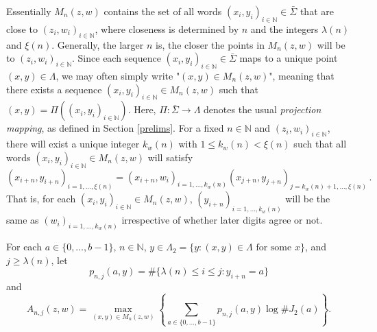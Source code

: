 \documentclass[12pt]{article}
\theoremstyle{remark}
\numberwithin{equation}{section}
\renewcommand{\Bbb}[1]{\mathbb{#1}}
\newcommand{\N}{{\Bbb N}}         %
\newcommand{\0}{\mathbf{0}}
\begin{document}
Essentially $M_{n}(z,w)$ contains the set of all words $(x_{i},y_{i})_{i \in \N} \in \bar{\Sigma}$ that are close to $(z_{i},w_{i})_{i \in \N}$, where closeness is determined by $n$ and the integers $\lambda(n)$ and $\xi(n)$. Generally, the larger $n$ is, the closer the points in $M_n(z,w)$ will be to $(z_i,w_i)_{i \in \N}$. Since each sequence $(x_{i},y_{i})_{i \in \N} \in \bar{\Sigma}$ maps to a unique point $(x,y) \in \Lambda$, we may often simply write "$(x,y) \in M_{n}(z,w)$", meaning that there exists a sequence $(x_{i},y_{i})_{i \in \N} \in M_{n}(z,w)$ such that $(x,y)=\Pi((x_{i},y_{i})_{i \in \N})$. Here, $\Pi: \bar{\Sigma} \to \Lambda$ denotes the usual \emph{projection mapping}, as defined in Section \ref{prelims}. For a fixed $n \in \N$ and $(z_{i},w_{i})_{i \in \N}$, there will exist a unique integer $k_{w}(n)$ with $1 \leq k_{w}(n) < \xi(n)$ such that all words $(x_{i},y_{i})_{i \in \N} \in M_{n}(z,w)$ will satisfy
 \begin{equation*}
 (x_{i+n},y_{i+n})_{i=1, \dots, \xi(n)}=(x_{i+n},w_{i})_{i=1, \dots, k_{w}(n)}(x_{j+n},y_{j+n})_{j=k_{w}(n)+1, \dots , \xi(n)}\, .
 \end{equation*}
That is, for each $(x_{i},y_{i})_{i \in \N} \in M_{n}(z,w)$, $(y_{i+n})_{i=1,\dots, k_{w}(n)}$ will be the same as $(w_{i})_{i=1,\dots,k_{w}(n)}$ irrespective of whether later digits agree or not. 

For each $a \in \{0, \dots , b-1\}$, $n \in \N$, $y \in \Lambda_{2}=\{y : (x,y) \in \Lambda \text{ for some } x\}$, and $j \geq \lambda(n)$, let
\begin{equation*}
     p_{n,j}(a,y)=\#\{ \lambda(n) \leq i \leq j : y_{i+n}=a\}
\end{equation*}
and
\begin{equation*}
    A_{n,j}(z,w)= \max_{(x,y) \in M_{n}(z,w)} \left\{ \sum_{a \in \{0, \dots , b-1\}} p_{n,j}(a, y) \log\#J_{2}(a) \right\}.
\end{equation*}
\end{document}
